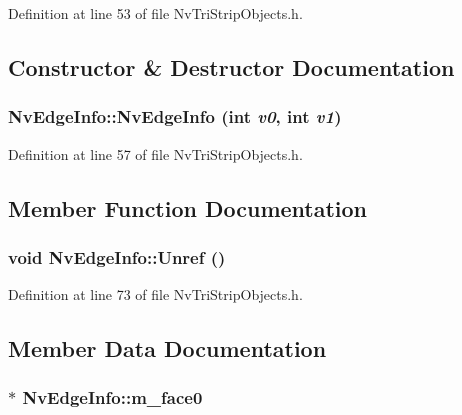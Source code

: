 Definition at line 53 of file NvTriStripObjects.h.

\subsection{Constructor \& Destructor Documentation}
\hypertarget{class_nv_edge_info_46d291d321a07131f767b0a6c3584bd6}{
\subsubsection[{NvEdgeInfo}]{\setlength{\rightskip}{0pt plus 5cm}NvEdgeInfo::NvEdgeInfo (int {\em v0}, \/  int {\em v1})}}
\label{class_nv_edge_info_46d291d321a07131f767b0a6c3584bd6}




Definition at line 57 of file NvTriStripObjects.h.

\subsection{Member Function Documentation}
\hypertarget{class_nv_edge_info_8a2041a388aa36374a480b8122edb852}{
\subsubsection[{Unref}]{\setlength{\rightskip}{0pt plus 5cm}void NvEdgeInfo::Unref ()}}
\label{class_nv_edge_info_8a2041a388aa36374a480b8122edb852}




Definition at line 73 of file NvTriStripObjects.h.

\subsection{Member Data Documentation}
\hypertarget{class_nv_edge_info_aaa29908d45f884793dff67511067d39}{
\subsubsection[{m\_\-face0}]{$\ast$ {\bf NvEdgeInfo::m\_\-face0}}}
\label{class_nv_edge_info_aaa29908d45f884793dff67511067d39}




